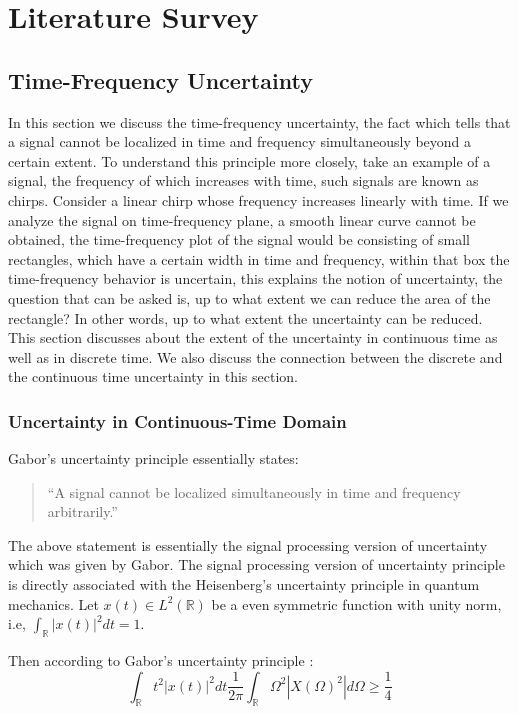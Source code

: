 \chapter{Literature Survey}
\section{\label{sub:Filter-bank-design time-frequency}Time-Frequency Uncertainty}
In this section we discuss the time-frequency uncertainty, the fact which tells that a signal cannot be localized in time and frequency simultaneously beyond a certain extent. To understand this principle more closely, take an example of a signal, the frequency of which increases with time, such signals are known as chirps. Consider a linear chirp whose frequency increases linearly with time. If we analyze the signal on time-frequency plane, a smooth linear curve cannot be obtained, the time-frequency plot of the signal would be consisting of small rectangles, which have a certain width in time and frequency, within that box the time-frequency behavior is uncertain, this explains the notion of uncertainty, the question that can be asked is, up to what extent we can reduce the area of the rectangle? In other words, up to what extent the uncertainty can be reduced. This section discusses about the extent of the uncertainty in continuous time as well as in discrete time. We also discuss the connection between the discrete and the continuous time uncertainty in this section.
\subsection{\label{sub:Uncertainty-in-continuous}Uncertainty in Continuous-Time Domain}
Gabor's uncertainty principle \cite{key-19} essentially states:
\begin{quote}
{}``A signal cannot be localized simultaneously in time and frequency
arbitrarily.''
\end{quote}
The above statement is essentially the signal processing version of uncertainty which was given by Gabor. The signal processing version of uncertainty principle \cite{key-19} is directly associated with the Heisenberg's uncertainty principle in quantum mechanics. 
Let $x(t) \in L^2(\mathbb{R})$ be a even symmetric function with unity norm, i.e, $\int_{\mathbb{R}}|x(t)|^{2}dt=1$.

Then according to Gabor's uncertainty principle \cite{key-19} :
\begin{equation}
\int_{\mathbb{R}}t^{2}|x(t)|^{2}dt\frac{1}{2\pi}\int_{\mathbb{R}}\Omega^{2}|X(\Omega)^{2}|d\Omega\ge\frac{1}{4}
\label{uncertaintyprinciple}
\end{equation}

